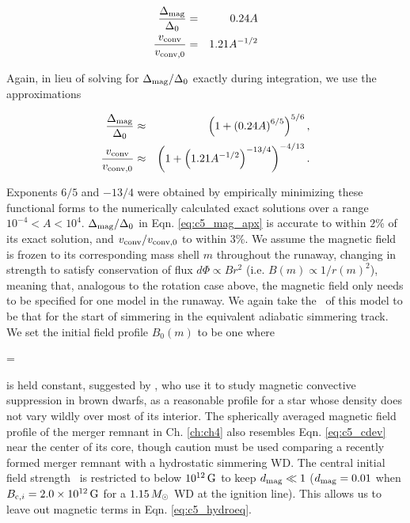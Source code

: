 
\begin{eqnarray}
\frac{\dnabmag}{\dnabconvzero} &=& 0.24A \nonumber \\
\frac{\vconv}{\vconvzero} &=& 1.21A^{-1/2}
\label{eq:c5_mag_exactsoln}
\end{eqnarray}

\noindent Again, in lieu of solving for $\dnabmag/\dnabconvzero$ exactly during integration, we use the approximations 

\begin{eqnarray}
\frac{\dnabmag}{\dnabconvzero} &\approx& \left(1 + \left(0.24A\right)^{6/5}\right)^{5/6}, \nonumber \\
\frac{\vconv}{\vconvzero} &\approx& \left(1 + \left(1.21A^{-1/2}\right)^{-13/4}\right)^{-4/13}.
\label{eq:c5_mag_apx}
\end{eqnarray}

\noindent Exponents $6/5$ and $-13/4$ were obtained by empirically minimizing these functional forms to the numerically calculated exact solutions over a range $10^{-4} < A < 10^4$.  $\dnabmag/\dnabconvzero$ in Eqn. \ref{eq:c5_mag_apx} is accurate to within $2$\% of its exact solution, and $\vconv/\vconvzero$ to within $3$\%.  We assume the magnetic field is frozen to its corresponding mass shell $m$ throughout the runaway, changing in strength to satisfy conservation of flux $d\Phi \propto B r^2$ (i.e. $B(m) \propto 1/r(m)^2$), meaning that, analogous to the rotation case above, the magnetic field only needs to be specified for one model in the runaway.  We again take the \Sc\ of this model to be that for the start of simmering in the equivalent adiabatic simmering track.  We set the initial field profile $B_0(m)$ to be one where

\eqbegin
\dmag = 
\label{eq:c5_cdev}
\eqend


\noindent is held constant, suggested by \cite{macdm09}, who use it to study magnetic convective suppression in brown dwarfs, as a reasonable profile for a star whose density does not vary wildly over most of its interior.  The spherically averaged magnetic field profile of the merger remnant in Ch. \ref{ch:ch4} also resembles Eqn. \ref{eq:c5_cdev} near the center of its core, though caution must be used comparing a recently formed merger remnant with a hydrostatic simmering WD.  The central initial field strength \Binit\ is restricted to below $10^{12}\,\mathrm{G}$ to keep $\dmag \ll 1$ ($\dmag = 0.01$ when $\Binit = 2.0\times10^{12}\,\mrm{G}$ for a $1.15\,\Msun$ WD at the ignition line).  This allows us to leave out magnetic terms in Eqn. \ref{eq:c5_hydroeq}.

